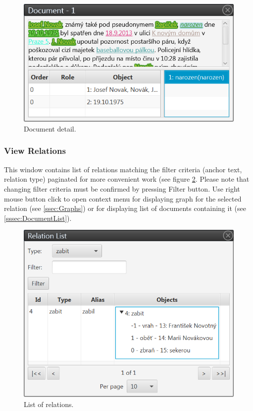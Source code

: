 \documentclass[12pt,a4paper]{report}
\begin{document}
\begin{figure}[!htb]
        \centering
        \includegraphics[width=\textwidth]{Images/documentview}
        \caption{Document detail.}
        \label{fig:DocumentView}
\end{figure}

\subsubsection{View Relations}

This window contains list of relations matching the filter criteria (anchor
text, relation type) paginated for more convenient work (see figure
\ref{fig:RelationList}. Please note that changing filter criteria must be
confirmed by pressing Filter button. Use right mouse button click to open
context menu for displaying graph for the selected relation (see \ref{ssec:Graphs})
or for displaying list of documents containing it (see \ref{sssec:DocumentList}).

\begin{figure}[!htb]
        \centering
        \includegraphics[width=\textwidth]{Images/relationlist}
        \caption{List of relations.}
        \label{fig:RelationList}
\end{figure}
\end{document}
